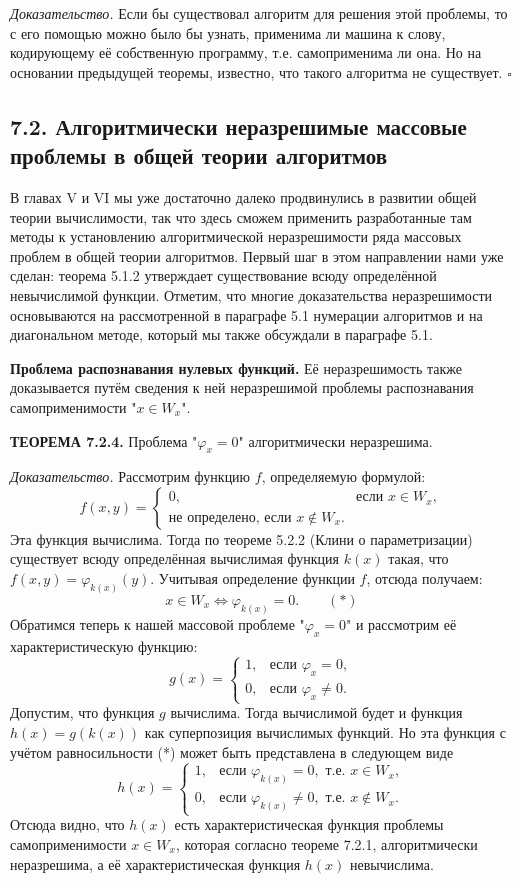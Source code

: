 \documentclass[a4paper,12pt]{article}
\begin{document}
\textit{Доказательство.} Если бы существовал алгоритм для решения этой проблемы, то с его помощью можно было бы узнать, применима ли машина к слову, кодирующему её собственную программу, т.е. самоприменима ли она. Но на основании предыдущей теоремы, известно, что такого алгоритма не существует. \(\square\)

\subsection*{7.2. Алгоритмически неразрешимые массовые проблемы в общей теории алгоритмов}

В главах V и VI мы уже достаточно далеко продвинулись в развитии общей теории вычислимости, так что здесь сможем применить разработанные там методы к установлению алгоритмической неразрешимости ряда массовых проблем в общей теории алгоритмов. Первый шаг в этом направлении нами уже сделан: теорема 5.1.2 утверждает существование всюду определённой невычислимой функции. Отметим, что многие доказательства неразрешимости основываются на рассмотренной в параграфе 5.1 нумерации алгоритмов и на диагональном методе, который мы также обсуждали в параграфе 5.1.

\textbf{Проблема распознавания нулевых функций.} Её неразрешимость также доказывается путём сведения к ней неразрешимой проблемы распознавания самоприменимости "\(x \in W_x\)".

\textbf{ТЕОРЕМА 7.2.4.} Проблема "\(\varphi_x = 0\)" алгоритмически неразрешима.

\textit{Доказательство.} Рассмотрим функцию \(f\), определяемую формулой:
\[
f(x, y) = 
\begin{cases}
0, & \text{если } x \in W_x, \\
\text{не определено, если } x \notin W_x.
\end{cases}
\]
Эта функция вычислима. Тогда по теореме 5.2.2 (Клини о параметризации) существует всюду определённая вычислимая функция \(k(x)\) такая, что \(f(x, y) = \varphi_{k(x)}(y)\). Учитывая определение функции \(f\), отсюда получаем:
\[
x \in W_x \iff \varphi_{k(x)} = 0. \qquad (*)
\]
Обратимся теперь к нашей массовой проблеме "\(\varphi_x = 0\)" и рассмотрим её характеристическую функцию:
\[
g(x) = 
\begin{cases}
1, & \text{если } \varphi_x = 0, \\
0, & \text{если } \varphi_x \neq 0.
\end{cases}
\]
Допустим, что функция \(g\) вычислима. Тогда вычислимой будет и функция \(h(x) = g(k(x))\) как суперпозиция вычислимых функций. Но эта функция с учётом равносильности (*) может быть представлена в следующем виде
\[
h(x) = 
\begin{cases}
1, & \text{если } \varphi_{k(x)} = 0, \text{ т.е. } x \in W_x, \\
0, & \text{если } \varphi_{k(x)} \neq 0, \text{ т.е. } x \notin W_x.
\end{cases}
\]
Отсюда видно, что \(h(x)\) есть характеристическая функция проблемы самоприменимости \(x \in W_x\), которая согласно теореме 7.2.1, алгоритмически неразрешима, а её характеристическая функция \(h(x)\) невычислима.
\end{document}
